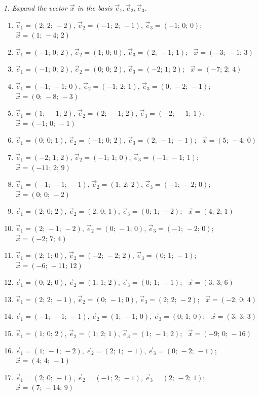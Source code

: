 \emph{1. Expand the vector $\vec x$ in the basis $\vec e_1,\vec e_2,\vec e_3$.}
\bigskip
\begin{enumerate}[label=\arabic*., leftmargin=*]
\item $\vec e_1=(2;\,2;\,-2)$, $\vec e_2=(-1;\,2;\,-1)$, $\vec e_3=(-1;\,0;\,0)$; \ $\vec x=(1;\,-4;\,2)$
\item $\vec e_1=(-1;\,0;\,2)$, $\vec e_2=(1;\,0;\,0)$, $\vec e_3=(2;\,-1;\,1)$; \ $\vec x=(-3;\,-1;\,3)$
\item $\vec e_1=(-1;\,0;\,2)$, $\vec e_2=(0;\,0;\,2)$, $\vec e_3=(-2;\,1;\,2)$; \ $\vec x=(-7;\,2;\,4)$
\item $\vec e_1=(-1;\,-1;\,0)$, $\vec e_2=(-1;\,2;\,1)$, $\vec e_3=(0;\,-2;\,-1)$; \ $\vec x=(0;\,-8;\,-3)$
\item $\vec e_1=(1;\,-1;\,2)$, $\vec e_2=(2;\,-1;\,2)$, $\vec e_3=(-2;\,-1;\,1)$; \ $\vec x=(-1;\,0;\,-1)$
\item $\vec e_1=(0;\,0;\,1)$, $\vec e_2=(-1;\,0;\,2)$, $\vec e_3=(2;\,-1;\,-1)$; \ $\vec x=(5;\,-4;\,0)$
\item $\vec e_1=(-2;\,1;\,2)$, $\vec e_2=(-1;\,1;\,0)$, $\vec e_3=(-1;\,-1;\,1)$; \ $\vec x=(-11;\,2;\,9)$
\item $\vec e_1=(-1;\,-1;\,-1)$, $\vec e_2=(1;\,2;\,2)$, $\vec e_3=(-1;\,-2;\,0)$; \ $\vec x=(0;\,0;\,-2)$
\item $\vec e_1=(2;\,0;\,2)$, $\vec e_2=(2;\,0;\,1)$, $\vec e_3=(0;\,1;\,-2)$; \ $\vec x=(4;\,2;\,1)$
\item $\vec e_1=(2;\,-1;\,-2)$, $\vec e_2=(0;\,-1;\,0)$, $\vec e_3=(-1;\,-2;\,0)$; \ $\vec x=(-2;\,7;\,4)$
\item $\vec e_1=(2;\,1;\,0)$, $\vec e_2=(-2;\,-2;\,2)$, $\vec e_3=(0;\,1;\,-1)$; \ $\vec x=(-6;\,-11;\,12)$
\item $\vec e_1=(0;\,2;\,0)$, $\vec e_2=(1;\,1;\,2)$, $\vec e_3=(0;\,1;\,-1)$; \ $\vec x=(3;\,3;\,6)$
\item $\vec e_1=(2;\,2;\,-1)$, $\vec e_2=(0;\,-1;\,0)$, $\vec e_3=(2;\,2;\,-2)$; \ $\vec x=(-2;\,0;\,4)$
\item $\vec e_1=(-1;\,-1;\,-1)$, $\vec e_2=(1;\,-1;\,0)$, $\vec e_3=(0;\,1;\,0)$; \ $\vec x=(3;\,3;\,3)$
\item $\vec e_1=(1;\,0;\,2)$, $\vec e_2=(1;\,2;\,1)$, $\vec e_3=(1;\,-1;\,2)$; \ $\vec x=(-9;\,0;\,-16)$
\item $\vec e_1=(1;\,-1;\,-2)$, $\vec e_2=(2;\,1;\,-1)$, $\vec e_3=(0;\,-2;\,-1)$; \ $\vec x=(4;\,4;\,-1)$
\item $\vec e_1=(2;\,0;\,-1)$, $\vec e_2=(-1;\,2;\,-1)$, $\vec e_3=(2;\,-2;\,1)$; \ $\vec x=(7;\,-14;\,9)$

\end{enumerate}

